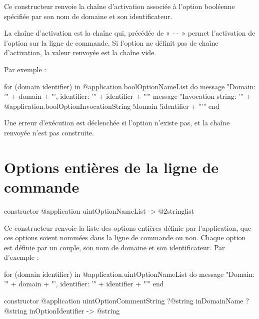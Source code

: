Ce constructeur renvoie la chaîne d'activation associée à l'option booléenne spécifiée par son nom de domaine et son identificateur.

La chaîne d'activation est la chaîne qui, précédée de « \texttt{-{}-} » permet l'activation de l'option sur la ligne de commande. Si l'option ne définit pas de chaîne d'activation, la valeur renvoyée est la chaîne vide.

 Par exemple :
\begin{galgas}
for (domain identifier) in @application.boolOptionNameList do
  message "Domain: '" + domain + "', identifier: '" + identifier + "'\n"
  message "Invocation string: '"
    + @application.boolOptionInvocationString {!domain !identifier} + "'\n"
end
\end{galgas}

Une erreur d'exécution est déclenchée si l'option n'existe pas, et la chaîne renvoyée n'est pas construite.











\section{Options entières de la ligne de commande}


\begin{galgasbox}
constructor @application uintOptionNameList -> @2stringlist
\end{galgasbox}

Ce constructeur renvoie la liste des options entières définie par l'application, que ces options soient nommées dans la ligne de commande ou non. Chaque option est définie par un couple, son nom de domaine et son identificateur. Par d'exemple :
\begin{galgas}
for (domain identifier) in @application.uintOptionNameList do
  message "Domain: '" + domain + "', identifier: '" + identifier + "'\n"
end
\end{galgas}



\begin{galgasbox}
constructor @application uintOptionCommentString
    ?@string inDomainName
    ?@string inOptionIdentifier -> @string
\end{galgasbox}

